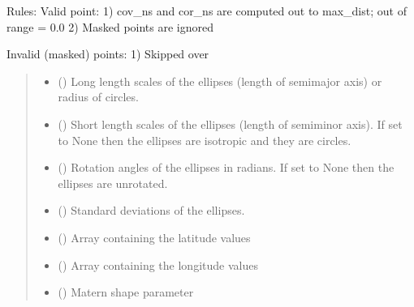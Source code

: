 \documentclass[letterpaper,10pt,english]{sphinxmanual}
\begin{document}
\begin{fulllineitems}
\sphinxAtStartPar
Rules:
Valid point:
1) cov\_ns and cor\_ns are computed out to max\_dist; out of range = 0.0
2) Masked points are ignored

\sphinxAtStartPar
Invalid (masked) points:
1) Skipped over
\begin{quote}\begin{description}
\begin{itemize}
\item {}
\sphinxAtStartPar
{} () \textendash{} Long length scales of the ellipses (length of semi\sphinxhyphen{}major axis) or radius
of circles.

\item {}
\sphinxAtStartPar
{} (\sphinxstyleliteralemphasis{\sphinxupquote{ | }}) \textendash{} Short length scales of the ellipses (length of semi\sphinxhyphen{}minor axis). If set
to None then the ellipses are isotropic and they are circles.

\item {}
\sphinxAtStartPar
{} (\sphinxstyleliteralemphasis{\sphinxupquote{ | }}) \textendash{} Rotation angles of the ellipses in radians. If set to None then the
ellipses are unrotated.

\item {}
\sphinxAtStartPar
{} () \textendash{} Standard deviations of the ellipses.

\item {}
\sphinxAtStartPar
{} () \textendash{} Array containing the latitude values

\item {}
\sphinxAtStartPar
{} () \textendash{} Array containing the longitude values

\item {}
\sphinxAtStartPar
{} () \textendash{} Matern shape parameter


\end{itemize}
\end{description}
\end{quote}
\end{fulllineitems}
\end{document}
